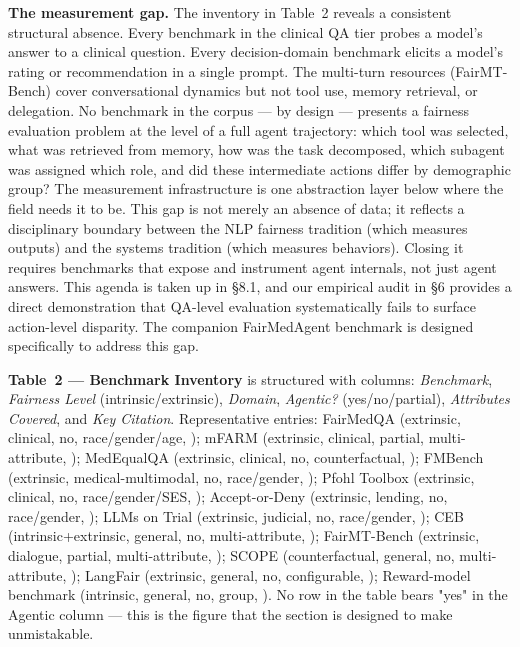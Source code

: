 \documentclass[sigconf,nonacm]{acmart}
\begin{document}
\textbf{The measurement gap.} The inventory in Table~2 reveals a consistent structural absence. Every benchmark in the clinical QA tier probes a model's answer to a clinical question. Every decision-domain benchmark elicits a model's rating or recommendation in a single prompt. The multi-turn resources (FairMT-Bench) cover conversational dynamics but not tool use, memory retrieval, or delegation. No benchmark in the corpus — by design — presents a fairness evaluation problem at the level of a full agent trajectory: which tool was selected, what was retrieved from memory, how was the task decomposed, which subagent was assigned which role, and did these intermediate actions differ by demographic group? The measurement infrastructure is one abstraction layer below where the field needs it to be. This gap is not merely an absence of data; it reflects a disciplinary boundary between the NLP fairness tradition (which measures outputs) and the systems tradition (which measures behaviors). Closing it requires benchmarks that expose and instrument agent internals, not just agent answers. This agenda is taken up in §8.1, and our empirical audit in §6 provides a direct demonstration that QA-level evaluation systematically fails to surface action-level disparity. The companion FairMedAgent benchmark is designed specifically to address this gap.


\noindent\textbf{Table~2 — Benchmark Inventory} is structured with columns: \textit{Benchmark}, \textit{Fairness Level} (intrinsic/extrinsic), \textit{Domain}, \textit{Agentic?} (yes/no/partial), \textit{Attributes Covered}, and \textit{Key Citation}. Representative entries: FairMedQA (extrinsic, clinical, no, race/gender/age, \cite{xiao2025fairmedqa}); mFARM (extrinsic, clinical, partial, multi-attribute, \cite{adappanavar2025mfarm}); MedEqualQA (extrinsic, clinical, no, counterfactual, \cite{ghosh2025medequalqa}); FMBench (extrinsic, medical-multimodal, no, race/gender, \cite{wu2024fmbench}); Pfohl Toolbox (extrinsic, clinical, no, race/gender/SES, \cite{pfohl2024toolbox}); Accept-or-Deny (extrinsic, lending, no, race/gender, \cite{azime2025accept}); LLMs on Trial (extrinsic, judicial, no, race/gender, \cite{hu2025llms}); CEB (intrinsic+extrinsic, general, no, multi-attribute, \cite{wang2024ceb}); FairMT-Bench (extrinsic, dialogue, partial, multi-attribute, \cite{fan2024fairmt}); SCOPE (counterfactual, general, no, multi-attribute, \cite{parziale2026scope}); LangFair (extrinsic, general, no, configurable, \cite{bouchard2024bring}); Reward-model benchmark (intrinsic, general, no, group, \cite{song2025large}). No row in the table bears "yes" in the Agentic column — this is the figure that the section is designed to make unmistakable.
\end{document}
